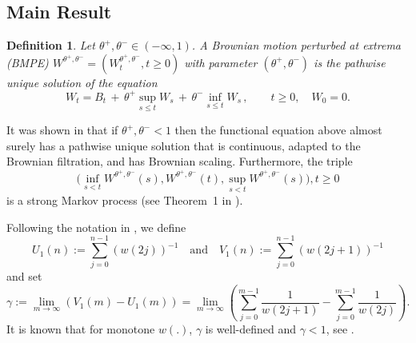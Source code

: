 \documentclass[twoside,12pt, a4paper]{article}
\newtheorem{definition}{Definition}[section]
\numberwithin{equation}{section}
\theoremstyle{remark}
\newcommand{\comment}[1]{\textcolor{blue}{(Comment: #1)}}
\begin{document}
	
	
	
	
	\subsection{Main Result}
	\begin{definition}
		\label{defn:BMPE}
		Let $\theta^+, \theta^- \in (- \infty , 1)$. A Brownian motion perturbed at
		extrema (BMPE) $W^{\theta^+, \theta^-} = \left(W^{\theta^+, \theta^-}_t, t\geq 0\right)$ with parameter $(\theta^+, \theta^-)$ is the pathwise unique solution of the equation
		$$
		W_t = B_t \,+\, \theta^+ \sup_{s\leq t} W_s  \,+\, \theta^- \inf_{s\leq t} W_s \,,   \qquad t \ge 0, \quad W_0 = 0.
		$$
	\end{definition}
	It was shown in \cite{PW97, CD99} that if $\theta^+, \theta^- < 1$ then the functional equation above almost surely has a pathwise unique solution that is continuous, adapted to the Brownian filtration, and has Brownian scaling. 
	Furthermore, the triple 
	$${\big(\inf_{s < t} W^{\theta^{+}, \theta^{-}}(s), 
		W^{\theta^{+}, \theta^{-}}(t) , 
		\sup _{s<t} W^{\theta^{+}, \theta^{-}}(s)\big)}, t \geq 0$$ is a strong Markov process (see Theorem~1 in \cite{PW97}).
	
	Following the notation in \cite{T96}, we define
	\[
	U_1(n):=\sum_{j=0}^{n-1}(w(2 j))^{-1} \quad \text{and} \quad
	V_1(n):=\sum_{j=0}^{n-1}(w(2 j+1))^{-1}
	\]
	and set
	\begin{equation}
		\label{eq: gamma}
		\gamma:= \lim_{m\to \infty}\left( V_1(m) - U_1(m) \right) =\lim_{m\to \infty} \left( \sum_{j=0}^{m-1} \frac{1}{ w(2j+1)}-  \sum_{j=0}^{m-1}  \frac{1}{w(2j)} \right) 
		.\end{equation}
	It is known that for monotone $w(.)$, $\gamma$
	is well-defined and ${\gamma<1}$, see \cite{T96}. 
	
\end{document}
